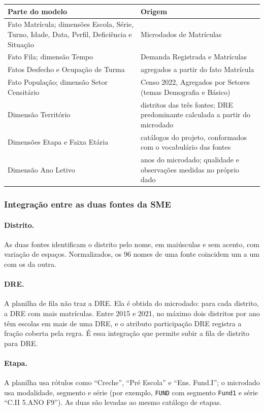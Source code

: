 \documentclass[11pt,a4paper]{article}
\newcommand{\cod}[1]{\texttt{#1}}
\begin{document}
\begin{table}[H]\centering\small
\begin{tabularx}{\linewidth}{>{\raggedright}p{5.2cm}X}
\toprule\textbf{Parte do modelo} & \textbf{Origem}\\\midrule
Fato Matrícula; dimensões Escola, Série, Turno, Idade, Data, Perfil, Deficiência e Situação & Microdados de Matrículas \\
Fato Fila; dimensão Tempo & Demanda Registrada e Matrículas \\
Fatos Desfecho e Ocupação de Turma & agregados a partir do fato Matrícula \\
Fato População; dimensão Setor Censitário & Censo 2022, Agregados por Setores (temas Demografia e Básico) \\
Dimensão Território & distritos das três fontes; DRE predominante calculada a partir do microdado \\
Dimensões Etapa e Faixa Etária & catálogos do projeto, conformados com o vocabulário das fontes \\
Dimensão Ano Letivo & anos do microdado; qualidade e observações medidas no próprio dado \\
\bottomrule\end{tabularx}
\end{table}

\subsubsection{Integração entre as duas fontes da SME}

\paragraph{Distrito.} As duas fontes identificam o distrito pelo nome, em maiúsculas e sem acento, com variação de espaços. Normalizados, os 96 nomes de uma fonte coincidem um a um com os da outra.

\paragraph{DRE.} A planilha de fila não traz a DRE. Ela é obtida do microdado: para cada distrito, a DRE com mais matrículas. Entre 2015 e 2021, no máximo dois distritos por ano têm escolas em mais de uma DRE, e o atributo participação DRE registra a fração coberta pela regra. É essa integração que permite subir a fila de distrito para DRE.

\paragraph{Etapa.} A planilha usa rótulos como ``Creche'', ``Pré Escola'' e ``Ens. Fund.I''; o microdado usa modalidade, segmento e série (por exemplo, \cod{FUND} com segmento \cod{Fund1} e série ``C.II 5.ANO F9''). As duas são levadas ao mesmo catálogo de etapas.
\end{document}
